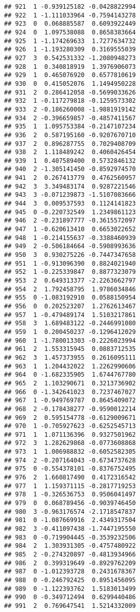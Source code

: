 \documentclass[
]{article}
\begin{document}
\begin{verbatim}
## 921  1 -0.939125182 -0.0428822994
## 922  1 -1.111033964 -0.7594143278
## 923  0  0.068885587  0.6093922449
## 924  0  1.097538088  0.8658383664
## 925  1 -1.174269633  1.7277634732
## 926  1 -1.193280309  0.3169555039
## 927  3  0.542531332 -1.2080948273
## 928  1  0.340818919  1.3976906073
## 929  1  0.465076920  0.6577810619
## 930  0  0.415052076  1.1494950228
## 931  2  0.286412058 -0.5699033626
## 932  1 -0.117279818 -0.1259573302
## 933  2 -0.186260008 -1.9881919142
## 934  2 -0.396659857 -0.4857411567
## 935  1  1.095753384 -0.2147107234
## 936  2  0.587195160 -0.9207670710
## 937  2  0.896287755  0.7029408709
## 938  2  1.118489242  0.4060426454
## 939  1  0.407589400  0.5732846132
## 940  2 -1.305141450 -0.8592974570
## 941  2  0.267413779  0.4762560957
## 942  3  3.349483174  0.9287221546
## 943  3 -0.071239873 -1.5107083666
## 944  3  0.009537593  0.1124141823
## 945  0 -0.220732549  1.2349861123
## 946  2 -0.231897777 -0.3615572097
## 947  1 -0.620613410  0.6653022652
## 948  1 -0.214155637 -0.3388460939
## 949  2 -0.506184664 -0.5908993636
## 950  3  0.930275226 -0.7447347658
## 951  1 -0.913096390  0.8824021940
## 952  1 -0.225339847  0.8877323079
## 953  2  0.649313377 -2.2263662797
## 954  2  1.792458795  1.9786034846
## 955  0 -1.083192910  0.0588150954
## 956  0  0.202523207  1.2762613467
## 957  1 -0.479489174  1.5103217861
## 958  3  1.689483122 -0.2446991080
## 959  1  0.200450237 -0.1296412029
## 960  1 -1.780013303 -0.2226023994
## 961  2  1.553315945  0.0883712535
## 962  3  1.457373955  0.2616095111
## 963  1  1.204432022  1.2262990606
## 964  0 -1.682335905  1.6744767780
## 965  2  1.103290671  0.3213736902
## 966  0 -1.342641023  0.7237467027
## 967  1 -0.949769787  0.8645409072
## 968  2 -0.178438277 -0.9590012214
## 969  2  0.595154778 -0.6129009671
## 970  1 -0.705927623 -0.6252545713
## 971  1  1.071136396  0.9327501962
## 972  3  1.282629868 -0.0773608868
## 973  1  1.006988832 -0.6052582305
## 974  2 -0.207164043 -0.6734737628
## 975  0 -0.554378101 -0.8376752495
## 976  2  1.660817490  0.4172316542
## 977  1  1.159371115 -0.2817719253
## 978  1 -0.326536753  0.9506041497
## 979  0  0.068789456 -0.9039746450
## 980  3 -0.963176574 -2.1718547837
## 981  0 -1.087669916  2.4349317504
## 982  3 -0.411097438 -1.7447195550
## 983  0 -0.719904445 -0.3539232506
## 984  2  1.303931305 -0.4757480922
## 985  2 -0.274320897 -0.4813934966
## 986  2  0.399319649 -0.8929762209
## 987  0 -1.012393728  0.2431678367
## 988  0 -0.246792425  0.8951456095
## 989  0 -1.122393762  1.5183013499
## 990  0 -0.349712494  0.6299440486
## 991  2  0.769647541  1.5214332009

\end{verbatim}
\end{document}
